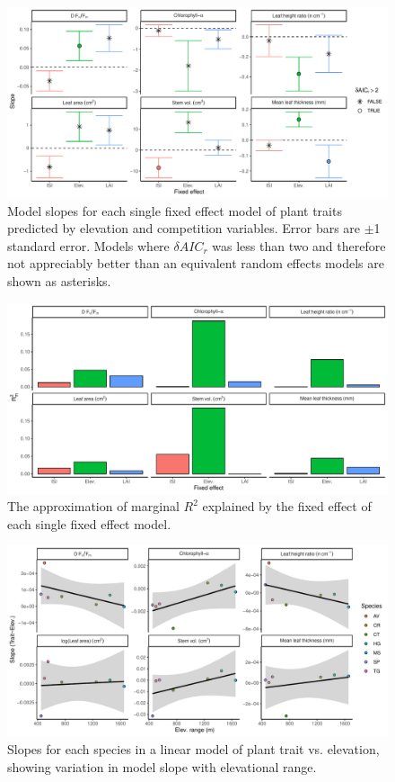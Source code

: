 \documentclass[a4paper, 11pt]{article}
\begin{document}
\begin{figure}[H]
\includegraphics[width=\textwidth]{single_pred_slope}
\centering
\caption{Model slopes for each single fixed effect model of plant traits predicted by elevation and competition variables. Error bars are $\pm$1 standard error. Models where $\delta{}AIC_r$ was less than two and therefore not appreciably better than an equivalent random effects models are shown as asterisks.}
\label{single_pred_slope}
\end{figure}

\begin{figure}[H]
\includegraphics[width=\textwidth]{single_pred_r2m}
\centering
\caption{The approximation of marginal $R^2$ explained by the fixed effect of each single fixed effect model.}
\label{single_pred_r2m}
\end{figure}

\begin{figure}[H]
\includegraphics[width=\textwidth]{slope_elev_scatter}
\centering
\caption{Slopes for each species in a linear model of plant trait vs. elevation, showing variation in model slope with elevational range.}
\label{slope_elev_scatter}
\end{figure}
\end{document}

